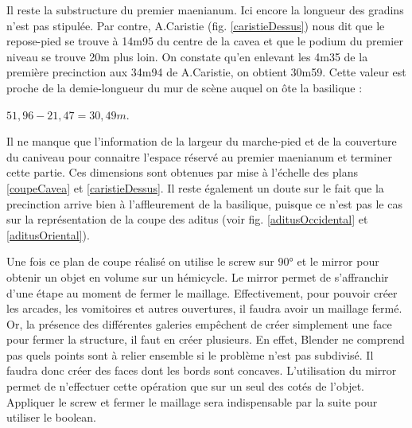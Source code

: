 Il reste la substructure du premier \gls{maenianum}. Ici encore la longueur des gradins n'est pas stipulée. Par contre, A.Caristie (fig. \ref{caristieDessus}) nous dit que le repose-pied se trouve à 14m95 du centre de la \gls{cavea} et que le \gls{podium} du premier niveau se trouve 20m plus loin. On constate qu'en enlevant les 4m35 de la première \gls{precinction} aux 34m94 de A.Caristie, on obtient 30m59. Cette valeur est proche de la demie-longueur du mur de scène auquel on ôte la basilique : 
\begin{center}
$51,96 - 21,47=30,49m$.
\end{center}

Il ne manque que l'information de la largeur du marche-pied et de la couverture du caniveau pour connaitre l'espace réservé au premier \gls{maenianum} et terminer cette partie. Ces dimensions sont obtenues par mise à l'échelle des plans \ref{coupeCavea} et \ref{caristieDessus}. Il reste également un doute sur le fait que la \gls{precinction} arrive bien à l'affleurement de la basilique, puisque ce n'est pas le cas sur la représentation de la coupe des \gls{aditus} (voir fig. \ref{aditusOccidental} et \ref{aditusOriental}).

Une fois ce plan de coupe réalisé on utilise le \gls{screw} sur 90° et le \gls{mirror} pour obtenir un objet en volume sur un hémicycle. Le \gls{mirror} permet de s'affranchir d'une étape au moment de fermer le maillage. Effectivement, pour pouvoir créer les arcades, les vomitoires et autres ouvertures, il faudra avoir un maillage fermé. Or, la présence des différentes galeries empêchent de créer simplement une face pour fermer la structure, il faut en créer plusieurs. En effet, Blender ne comprend pas quels points sont à relier ensemble si le problème n'est pas subdivisé. Il faudra donc créer des faces dont les bords sont concaves. L'utilisation du \gls{mirror} permet de n'effectuer cette opération que sur un seul des cotés de l'objet. Appliquer le \gls{screw} et fermer le maillage sera indispensable par la suite pour utiliser le \gls{boolean}.

